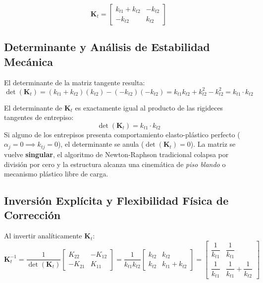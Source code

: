 \documentclass[11pt,letterpaper]{article}
\begin{document}
\begin{conceptbox}
\begin{equation}
    \label{eq:Kt_assembled}
    \mathbf{K}_t = 
    \begin{bmatrix}
        k_{t1} + k_{t2} & -k_{t2} \\
        -k_{t2} & k_{t2}
    \end{bmatrix}
\end{equation}
\end{conceptbox}

\subsection{Determinante y Análisis de Estabilidad Mecánica}

El determinante de la matriz tangente resulta:
\begin{equation}
    \det(\mathbf{K}_t) = (k_{t1} + k_{t2})(k_{t2}) - (-k_{t2})(-k_{t2}) = k_{t1} k_{t2} + k_{t2}^2 - k_{t2}^2 = k_{t1} \cdot k_{t2}
\end{equation}

\begin{alertbox}
El determinante de $\mathbf{K}_t$ es exactamente igual al producto de las rigideces tangentes de entrepiso:
\begin{equation}
    \det(\mathbf{K}_t) = k_{t1} \cdot k_{t2}
\end{equation}
Si alguno de los entrepisos presenta comportamiento elasto-plástico perfecto ($\alpha_j = 0 \implies k_{tj} = 0$), el determinante se anula ($\det(\mathbf{K}_t) = 0$). La matriz se vuelve \textbf{singular}, el algoritmo de Newton-Raphson tradicional colapsa por división por cero y la estructura alcanza una cinemática de \textit{piso blando} o mecanismo plástico libre de carga.
\end{alertbox}

\subsection{Inversión Explícita y Flexibilidad Física de Corrección}

Al invertir analíticamente $\mathbf{K}_t$:
\begin{equation}
    \mathbf{K}_t^{-1} = \frac{1}{\det(\mathbf{K}_t)} 
    \begin{bmatrix} 
        K_{22} & -K_{12} \\ 
        -K_{21} & K_{11} 
    \end{bmatrix} = \frac{1}{k_{t1} k_{t2}} 
    \begin{bmatrix} 
        k_{t2} & k_{t2} \\ 
        k_{t2} & k_{t1} + k_{t2} 
    \end{bmatrix} = 
    \begin{bmatrix} 
        \dfrac{1}{k_{t1}} & \dfrac{1}{k_{t1}} \\[0.35cm] 
        \dfrac{1}{k_{t1}} & \dfrac{1}{k_{t1}} + \dfrac{1}{k_{t2}} 
    \end{bmatrix}
\end{equation}
\end{document}
